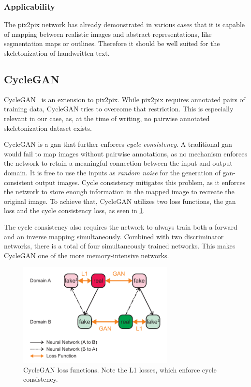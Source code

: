 \subsubsection{Applicability}

The \gls{pix2pix} network has already demonstrated in various cases that it is capable of mapping between realistic images and abstract representations, like segmentation maps or outlines. Therefore it should be well suited for the skeletonization of handwritten text.


\subsection{CycleGAN}

\gls{CycleGAN}~\cite{cyclegan} is an extension to \gls{pix2pix}. While \gls{pix2pix} requires annotated pairs of training data, \gls{CycleGAN} tries to overcome that restriction. This is especially relevant in our case, as, at the time of writing, no pairwise annotated skeletonization dataset exists.

\gls{CycleGAN} is a \gls{gan} that further enforces \emph{cycle consistency}. A traditional \gls{gan} would fail to map images without pairwise annotations, as no mechanism enforces the network to retain a meaningful connection between the input and output domain. It is free to use the inputs as \emph{random noise} for the generation of \gls{gan}-consistent output images. Cycle consistency mitigates this problem, as it enforces the network to store enough information in the mapped image to recreate the original image. To achieve that, \gls{CycleGAN} utilizes two loss functions, the \gls{gan} loss and the cycle consistency loss, as seen in \cref{fig:cycleGanLoss}.

The cycle consistency also requires the network to always train both a forward and an inverse mapping simultaneously. Combined with two discriminator networks, there is a total of four simultaneously trained networks. This makes CycleGAN one of the more memory-intensive networks.

\begin{figure}
  \centering
  \includegraphics[width=0.7\textwidth]{../assets/cycleGanLoss.pdf}
  \caption[CycleGAN loss functions]{\gls{CycleGAN} loss functions. Note the L1 losses, which enforce cycle consistency.}
  \label{fig:cycleGanLoss}
\end{figure}


